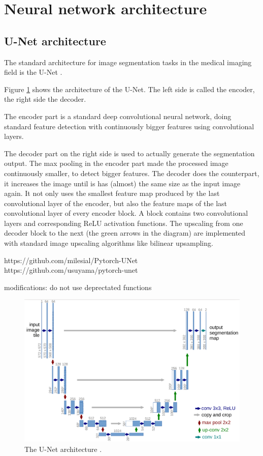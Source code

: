 \section{Neural network architecture}
\subsection{U-Net architecture}
The standard architecture for image segmentation tasks in the medical imaging field is the U-Net \cite{ronneberger2015u}.

Figure \ref{unet} shows the architecture of the U-Net. The left side is called the encoder, the right side the decoder.

The encoder part is a standard deep convolutional neural network, doing standard feature detection with continuously bigger features using convolutional layers.

The decoder part on the right side is used to actually generate the segmentation output. The max pooling in the encoder part made the processed image continuously smaller,
to detect bigger features. The decoder does the counterpart, it increases the image until is has (almost) the same size as the input image again. It not only uses
the smallest feature map produced by the last convolutional layer of the encoder, but also the feature maps of the last convolutional layer of every encoder block.
A block contains two convolutional layers and corresponding ReLU activation functions. The upscaling from one decoder block to the next (the green arrows in the diagram) are
implemented with standard image upscaling algorithms like bilinear upsampling.


https://github.com/milesial/Pytorch-UNet
https://github.com/usuyama/pytorch-unet

modifications: do not use deprectated functions

\begin{figure}[H]
\centering
\includegraphics[width=14cm]{images/unet.png}
\caption{The U-Net architecture \cite{ronneberger2015u}.}
\label{unet}
\end{figure}
